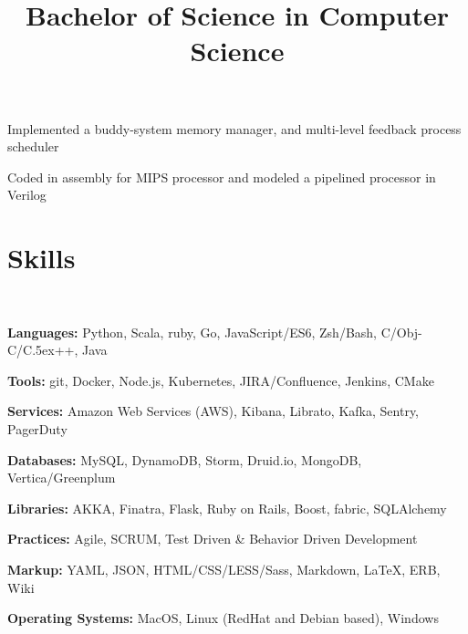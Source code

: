 \documentclass[12pt, tweaklist, line]{res}
\let\tempone\itemize
\let\temptwo\enditemize
\renewenvironment{itemize}{\tempone\vspace{-.15in}\setlength{\topsep}{0pt}\setlength{\itemsep}{3pt}\vspace{-.15in}}{\temptwo}
\def\Cplusplus{{\rm C\raise.5ex\hbox{\small ++}}}
\begin{document}
\begin{resume}
\title{Bachelor of Science in Computer Science}
\begin{position}
\begin{itemize}
\item Implemented a buddy-system memory manager, and multi-level feedback process scheduler
\item Coded in assembly for MIPS processor and modeled a pipelined processor in Verilog
\end{itemize}
\end{position}

\section{Skills}

~\\ %

\begin{itemize}
\item \textbf{Languages:} Python, Scala, ruby, Go, JavaScript/ES6, Zsh/Bash, C/Obj-C/\Cplusplus, Java
\item \textbf{Tools:} git, Docker, Node.js, Kubernetes, JIRA/Confluence, Jenkins, CMake
\item \textbf{Services:} Amazon Web Services (AWS), Kibana, Librato, Kafka, Sentry, PagerDuty
\item \textbf{Databases:} MySQL, DynamoDB, Storm, Druid.io, MongoDB, Vertica/Greenplum
\item \textbf{Libraries:} AKKA, Finatra, Flask, Ruby on Rails, Boost, fabric, SQLAlchemy
\item \textbf{Practices:} Agile, SCRUM, Test Driven \& Behavior Driven Development
\item \textbf{Markup:} YAML, JSON, HTML/CSS/LESS/Sass, Markdown, \LaTeX, ERB, Wiki
\item \textbf{Operating Systems:} MacOS, Linux (RedHat and Debian based), Windows
\end{itemize}


\end{resume}
\end{document}
